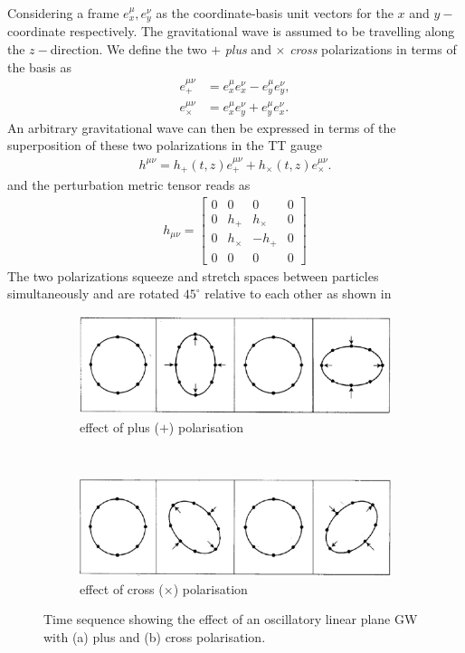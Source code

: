 Considering a frame $e_{x}^{\mu}, e_y^{\nu}$ as the coordinate-basis unit vectors for the $x$ and $y-$coordinate respectively. The gravitational wave is assumed to be travelling along the $z-$direction. We define the two $+$ \textit{plus} and $\times$ \textit{cross} polarizations in terms of the basis as
\begin{align}
    e_{+}^{\mu\nu} &= e_x^{\mu}e_x^{\nu} - e_y^{\mu}e_y^{\nu},\\
    e_{\times}^{\mu\nu} &= e_x^{\mu}e_y^{\nu} + e_y^{\mu}e_x^{\nu}.
\end{align}
An arbitrary gravitational wave can then be expressed in terms of the superposition of these two polarizations in the TT gauge
\begin{align}
    h^{\mu\nu} = h_+(t,z)e^{\mu\nu}_{+} + h_{\times}(t,z)e_{\times}^{\mu\nu}.
\end{align}
and the perturbation metric tensor reads as 
\begin{align}
   h_{\mu\nu} =  \begin{bmatrix}
                0 & 0 & 0 & 0 \\
                0 & h_+ & h_{\times} & 0 \\
                0 & h_{\times} & -h_+ & 0 \\
                0 & 0 & 0 & 0 
                \end{bmatrix}
\end{align}
The two polarizations squeeze and stretch spaces between particles simultaneously and are rotated
$45^{\circ}$ relative to each other as shown in 
\begin{figure}
\centering
\begin{subfigure}{\textwidth}
  \centering
  \includegraphics[width=0.5\linewidth]{figures/Introduction/pluspol.eps}
  \caption{effect of plus ($+$) polarisation}
  \label{fig:sub1}
\end{subfigure}\\
\begin{subfigure}{\textwidth}
  \centering
  \includegraphics[width=0.5\linewidth]{figures/Introduction/crosspol.eps}
  \caption{effect of cross ($\times$) polarisation}
  \label{fig:sub2}
\end{subfigure}
\caption{Time sequence showing the effect of an oscillatory linear plane GW with (a) plus and (b) cross polarisation.}
\label{fig:Polarisation}
\end{figure}


